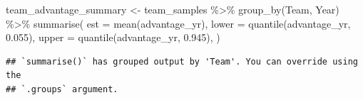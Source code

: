 \documentclass[
]{article}
\newenvironment{Shaded}{\begin{snugshade}}{\end{snugshade}}
\newcommand{\AttributeTok}[1]{\textcolor[rgb]{0.77,0.63,0.00}{#1}}
\newcommand{\FloatTok}[1]{\textcolor[rgb]{0.00,0.00,0.81}{#1}}
\newcommand{\FunctionTok}[1]{\textcolor[rgb]{0.00,0.00,0.00}{#1}}
\newcommand{\NormalTok}[1]{#1}
\newcommand{\OtherTok}[1]{\textcolor[rgb]{0.56,0.35,0.01}{#1}}
\newcommand{\SpecialCharTok}[1]{\textcolor[rgb]{0.00,0.00,0.00}{#1}}
\begin{document}
\begin{Shaded}
\begin{Highlighting}[]
\NormalTok{team\_advantage\_summary }\OtherTok{\textless{}{-}}
\NormalTok{  team\_samples }\SpecialCharTok{\%\textgreater{}\%}
  \FunctionTok{group\_by}\NormalTok{(Team, Year) }\SpecialCharTok{\%\textgreater{}\%}
  \FunctionTok{summarise}\NormalTok{(}
    \AttributeTok{est =} \FunctionTok{mean}\NormalTok{(advantage\_yr),}
    \AttributeTok{lower =} \FunctionTok{quantile}\NormalTok{(advantage\_yr, }\FloatTok{0.055}\NormalTok{),}
    \AttributeTok{upper =} \FunctionTok{quantile}\NormalTok{(advantage\_yr, }\FloatTok{0.945}\NormalTok{),}
\NormalTok{  )}
\end{Highlighting}
\end{Shaded}

\begin{verbatim}
## `summarise()` has grouped output by 'Team'. You can override using the
## `.groups` argument.
\end{verbatim}
\end{document}
